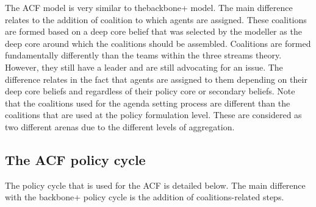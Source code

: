 The ACF model is very similar to thebackbone+ model. The main difference relates to the addition of coalition to which agents are assigned. These coalitions are formed based on a deep core belief that was selected by the modeller as the deep core around which the coalitions should be assembled. Coalitions are formed fundamentally differently than the teams within the three streams theory. However, they still have a leader and are still advocating for an issue. The difference relates in the fact that agents are assigned to them depending on their deep core beliefs and regardless of their policy core or secondary beliefs. Note that the coalitions used for the agenda setting process are different than the coalitions that are used at the policy formulation level. These are considered as two different arenas due to the different levels of aggregation.

\subsection{The ACF policy cycle}

The policy cycle that is used for the ACF is detailed below. The main difference with the backbone+ policy cycle is the addition of coalitions-related steps.

